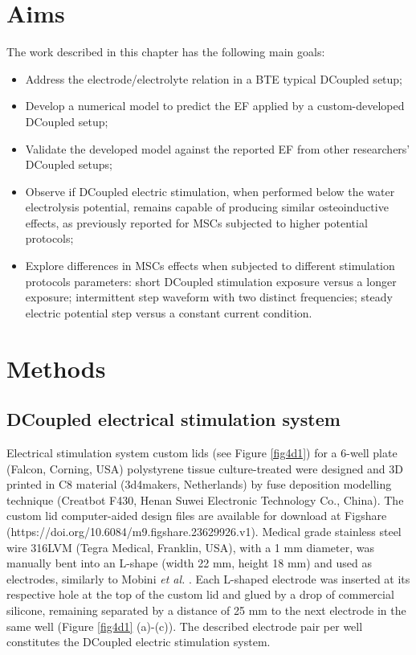 \section{Aims}
The work described in this chapter has the following main goals:
\begin{itemize}
\item Address the electrode/electrolyte relation in a \acs{BTE} typical \acs{DCoupled} setup;
\item Develop a numerical model to predict the \acs{EF} applied by a custom-developed \acs{DCoupled} setup;
\item Validate the developed model against the reported \acs{EF} from other researchers' \acs{DCoupled} setups;
\item Observe if \acs{DCoupled} electric stimulation, when performed below the water electrolysis potential, remains capable of producing similar osteoinductive effects, as previously reported for \acs{MSCs} subjected to higher potential protocols;
\item Explore differences in \acs{MSCs} effects when subjected to different stimulation protocols parameters: short \acs{DCoupled} stimulation exposure versus a longer exposure; intermittent step waveform with two distinct frequencies; steady electric potential step versus a constant current condition.  
\end{itemize}



\section{Methods}

\subsection{\acs{DCoupled} electrical stimulation system}
Electrical stimulation system custom lids (see Figure \ref{fig4d1}) for a 6-well plate (Falcon\textregistered, Corning, USA) polystyrene tissue culture-treated were designed and \ac{3D} printed in \acs{C8} material (3d4makers, Netherlands) \cite{Meneses2020-dx} by fuse deposition modelling technique (Creatbot F430, Henan Suwei Electronic Technology Co., China). The custom lid computer-aided design files are available for download at Figshare (https://doi.org/10.6084/m9.figshare.23629926.v1). Medical grade stainless steel wire 316LVM (Tegra Medical, Franklin, USA), with a 1 \si{\milli\meter} diameter, was manually bent into an L-shape (width 22 \si{\milli\meter}, height 18 \si{\milli\meter}) and used as electrodes, similarly to Mobini \textit{et al.} \cite{Mobini2016-jh}. Each L-shaped electrode was inserted at its respective hole at the top of the custom lid and glued by a drop of commercial silicone, remaining separated by a distance of 25 \si{\milli\meter} to the next electrode in the same well (Figure \ref{fig4d1} (a)-(c)). The described electrode pair per well constitutes the \ac{DCoupled} electric stimulation system.

